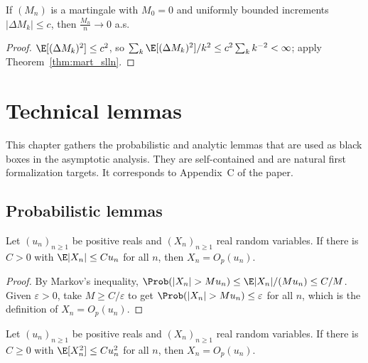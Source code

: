 \begin{corollary}\label{cor:mart_slln_bounded}
\leanok
{}
If $(M_n)$ is a martingale with $M_0=0$ and uniformly bounded increments
$|\Delta M_k| \le c$, then $\frac{M_n}{n}\to 0$ a.s.
\end{corollary}

\begin{proof}\leanok
$\E[(\Delta M_k)^2]\le c^2$, so $\sum_k \E[(\Delta M_k)^2]/k^2 \le c^2\sum_k k^{-2}
< \infty$; apply Theorem~\ref{thm:mart_slln}.
\end{proof}


\chapter{Technical lemmas}
\label{chap:technical}

This chapter gathers the probabilistic and analytic lemmas that are used as
black boxes in the asymptotic analysis. They are self-contained and are natural
first formalization targets. It corresponds to Appendix~C of the paper.

\section{Probabilistic lemmas}
\label{sec:tech_prob}

\begin{lemma}\label{lem:expectation_to_O}
\leanok
{}
Let $(u_n)_{n\ge1}$ be positive reals and $(X_n)_{n\ge1}$ real random variables.
If there is $C > 0$ with $\E|X_n| \le C u_n$ for all $n$, then $X_n = O_p(u_n)$.
\end{lemma}

\begin{proof}\leanok
By Markov's inequality, $\Prob(|X_n| > M u_n) \le \E|X_n|/(M u_n) \le C/M$.
Given $\varepsilon > 0$, take $M \ge C/\varepsilon$ to get
$\Prob(|X_n| > M u_n) \le \varepsilon$ for all $n$, which is the definition of
$X_n = O_p(u_n)$.
\end{proof}

\begin{lemma}\label{lem:sq_expectation_to_O}
\leanok
{}
Let $(u_n)_{n\ge1}$ be positive reals and $(X_n)_{n\ge1}$ real random variables.
If there is $C \ge 0$ with $\E[X_n^2] \le C u_n^2$ for all $n$, then $X_n = O_p(u_n)$.
\end{lemma}

